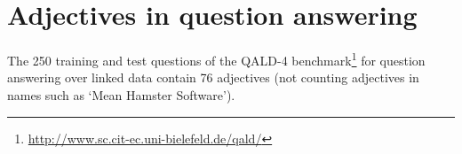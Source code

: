 \documentclass[11pt]{article}
\begin{document}
%
%
%



\section{Adjectives in question answering}

The 250 training and test questions of the QALD-4 benchmark\footnote{\url{http://www.sc.cit-ec.uni-bielefeld.de/qald/}} 
for question answering over linked data contain 76 adjectives (not counting adjectives in names such as `Mean Hamster Software'). 
\end{document}
